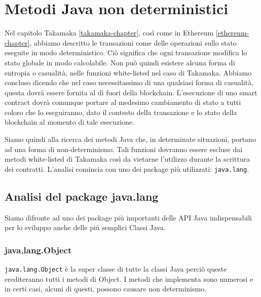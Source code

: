 
\chapter{Metodi Java non deterministici}
\label{metodi-java-non-deterministici}
	Nel capitolo Takamaka \ref{takamaka-chapter}, così come in Ethereum \ref{ethereum-chapter}, abbiamo descritto le transazioni come delle operazioni sullo stato eseguite in modo deterministico. Ciò significa che ogni transazione modifica lo stato globale in modo calcolabile. Non può quindi esistere alcuna forma di entropia o casualità, nelle funzioni white-listed nel caso di Takamaka. Abbiamo concluso dicendo che nel caso necessitassimo di una qualsiasi forma di casualità, questa dovrà essere fornita al di fuori della blockchain. L'esecuzione di uno smart contract dovrà comunque portare al medesimo cambiamento di stato a tutti coloro che lo eseguiranno, dato il contesto della transazione e lo stato della blockchain al momento di tale esecuzione. 

	Siamo quindi alla ricerca dei metodi Java che, in determinate situazioni, portano ad una forma di non-determinismo. Tali funzioni dovranno essere escluse dai metodi white-listed di Takamaka così da vietarne l'utilizzo durante la scrittura dei contratti. L'analisi comincia con uno dei package più utilizzati: \lstinline|java.lang|.

	\section{Analisi del package java.lang}
		Siamo difronte ad uno dei package più importanti delle API Java indispensabili per lo sviluppo anche delle più semplici Classi Java. 

		\subsection{java.lang.Object}
			\lstinline|java.lang.Object| è la super classe di tutte la classi Java perciò queste erediteranno tutti i metodi di Object. I metodi che implementa sono numerosi e in certi casi, alcuni di questi, possono causare non determinismo.

